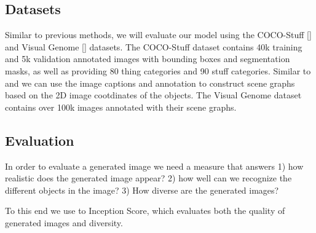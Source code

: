 \documentclass{article}
\begin{document}
\subsection{Datasets}

Similar to previous methods, we will evaluate our model using the COCO-Stuff [\citet{cocostuff}] and Visual Genome [\citet{visualgen}] datasets. The COCO-Stuff dataset contains 40k training and 5k validation annotated images with bounding boxes and segmentation masks, as well as providing 80 thing categories and 90 stuff categories. Similar to \citet{sg2im} and \citet{sg2imgcontext} we can use the image captions and annotation to construct scene graphs based on the 2D image cootdinates of the objects. The Visual Genome dataset contains over 100k images annotated with their scene graphs.

\subsection{Evaluation}

In order to evaluate a generated image we need a measure that answers 1) how realistic does the generated image appear? 2) how well can we recognize the different objects in the image? 3) How diverse are the generated images?

To this end we use to Inception Score, which evaluates both the quality of generated images and diversity.


\medskip
\small

\end{document}

